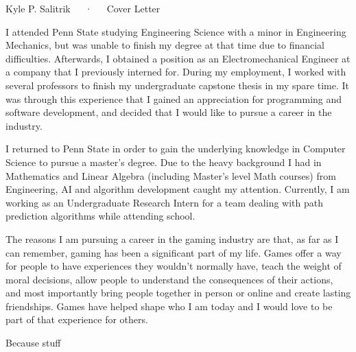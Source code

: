 \documentclass[12pt, a4paper]{awesome-cv}
\begin{document}
\makecvheader[C]
\vspace{-1em}
\makecvfooter
  {}
  {Kyle P. Salitrik~~~·~~~Cover Letter}
  {}

\makelettertitle

\begin{cvletter}

\quad I attended Penn State studying Engineering Science with a minor in Engineering Mechanics, but was unable to finish my degree at that time due to financial difficulties. Afterwards, I obtained a position as an Electromechanical Engineer at a company that I previously interned for. During my employment, I worked with several professors to finish my undergraduate capstone thesis in my spare time. It was through this experience that I gained an appreciation for programming and software development, and decided that I would like to pursue a career in the industry.

\quad I returned to Penn State in order to gain the underlying knowledge in Computer Science to pursue a master's degree. Due to the heavy background I had in Mathematics and Linear Algebra (including Master's level Math courses) from Engineering, AI and algorithm development caught my attention. Currently, I am working as an Undergraduate Research Intern for a team dealing with path prediction algorithms while attending school.

\quad The reasons I am pursuing a career in the gaming industry are that, as far as I can remember, gaming has been a significant part of my life. Games offer a way for people to have experiences they wouldn't normally have, teach the weight of moral decisions, allow people to understand the consequences of their actions, and most importantly bring people together in person or online and create lasting friendships. Games have helped shape who I am today and I would love to be part of that experience for others.

\quad Because stuff


\end{cvletter}
\end{document}
